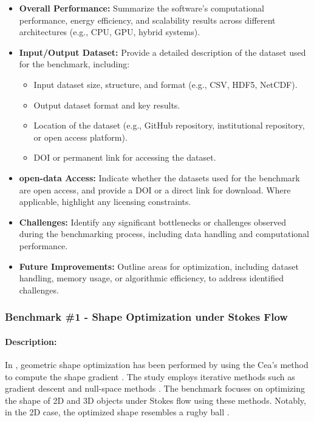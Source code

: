 \begin{itemize}
    \item \textbf{Overall Performance:} Summarize the software's computational performance, energy efficiency, and scalability results across different architectures (e.g., CPU, GPU, hybrid systems).
    \item \textbf{Input/Output Dataset:} Provide a detailed description of the dataset used for the benchmark, including:
        \begin{itemize}
            \item Input dataset size, structure, and format (e.g., CSV, HDF5, NetCDF).
            \item Output dataset format and key results.
            \item Location of the dataset (e.g., GitHub repository, institutional repository, or open access platform).
            \item DOI or permanent link for accessing the dataset.
        \end{itemize}
    \item \textbf{open-data Access:} Indicate whether the datasets used for the benchmark are open access, and provide a DOI or a direct link for download. Where applicable, highlight any licensing constraints.
    \item \textbf{Challenges:} Identify any significant bottlenecks or challenges observed during the benchmarking process, including data handling and computational performance.
    \item \textbf{Future Improvements:} Outline areas for optimization, including dataset handling, memory usage, or algorithmic efficiency, to address identified challenges.
\end{itemize}

\subsubsection{Benchmark \#1 - Shape Optimization under Stokes Flow}

\paragraph{Description:} In \cite{palazzolo2023shape}, geometric shape optimization has been performed by using the Cea's method to compute the shape gradient \cite{cea_conception_1986}. The study employs iterative methods such as gradient descent and null-space methods \cite{feppon_f_null_2020}. The benchmark focuses on optimizing the shape of 2D and 3D objects under Stokes flow using these methods. Notably, in the 2D case, the optimized shape resembles a rugby ball \cite{pironneau_optimum_1974}.

